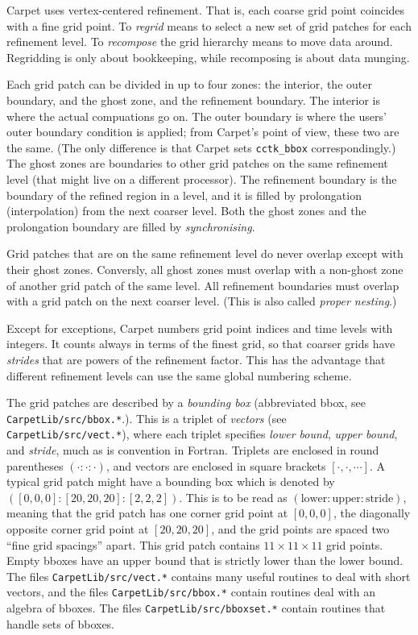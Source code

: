 \documentclass{article}
\begin{document}
   Carpet uses vertex-centered refinement.  That is, each coarse grid
   point coincides with a fine grid point.  To \emph{regrid} means to
   select a new set of grid patches for each refinement level.  To
   \emph{recompose} the grid hierarchy means to move data around.
   Regridding is only about bookkeeping, while recomposing is about
   data munging.

   Each grid patch can be divided in up to four zones: the interior,
   the outer boundary, and the ghost zone, and the refinement
   boundary.  The interior is where the actual compuations go on.  The
   outer boundary is where the users' outer boundary condition is
   applied; from Carpet's point of view, these two are the same.  (The
   only difference is that Carpet sets \texttt{cctk\_bbox}
   correspondingly.)  The ghost zones are boundaries to other grid
   patches on the same refinement level (that might live on a
   different processor).  The refinement boundary is the boundary of
   the refined region in a level, and it is filled by prolongation
   (interpolation) from the next coarser level.  Both the ghost zones
   and the prolongation boundary are filled by \emph{synchronising}.

   Grid patches that are on the same refinement level do never overlap
   except with their ghost zones.  Conversly, all ghost zones must
   overlap with a non-ghost zone of another grid patch of the same
   level.  All refinement boundaries must overlap with a grid patch on
   the next coarser level.  (This is also called \emph{proper
   nesting}.)

   Except for exceptions, Carpet numbers grid point indices and time
   levels with integers.  It counts always in terms of the finest
   grid, so that coarser grids have \emph{strides} that are powers of
   the refinement factor.  This has the advantage that different
   refinement levels can use the same global numbering scheme.

   The grid patches are described by a \emph{bounding box}
   (abbreviated bbox, see \texttt{CarpetLib/src/bbox.*}.).  This is a
   triplet of \emph{vectors} (see \texttt{CarpetLib/src/vect.*}),
   where each triplet specifies \emph{lower bound}, \emph{upper
   bound}, and \emph{stride}, much as is convention in Fortran.
   Triplets are enclosed in round parentheses $(\cdot:\cdot:\cdot)$,
   and vectors are enclosed in square brackets $[\cdot,\cdot,\cdots]$.
   A typical grid patch might have a bounding box which is denoted by
   $([0,0,0]:[20,20,20]:[2,2,2])$.  This is to be read as
   $(\textrm{lower}:\textrm{upper}:\textrm{stride})$, meaning that the
   grid patch has one corner grid point at $[0,0,0]$, the diagonally
   opposite corner grid point at $[20,20,20]$, and the grid points are
   spaced two ``fine grid spacings'' apart.  This grid patch contains
   $11 \times 11 \times 11$ grid points.  Empty bboxes have an upper
   bound that is strictly lower than the lower bound.  The files
   \texttt{CarpetLib/src/vect.*} contains many useful routines to deal
   with short vectors, and the files \texttt{CarpetLib/src/bbox.*}
   contain routines deal with an algebra of bboxes.  The files
   \texttt{CarpetLib/src/bboxset.*} contain routines that handle sets
   of bboxes.
\end{document}
